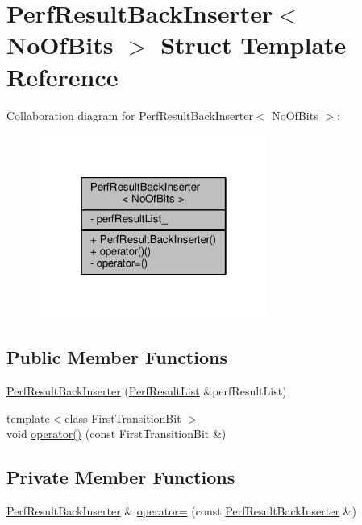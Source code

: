 \hypertarget{struct_perf_result_back_inserter}{}\section{Perf\+Result\+Back\+Inserter$<$ No\+Of\+Bits $>$ Struct Template Reference}
\label{struct_perf_result_back_inserter}


Collaboration diagram for Perf\+Result\+Back\+Inserter$<$ No\+Of\+Bits $>$\+:
\nopagebreak
\begin{figure}[H]
\begin{center}
\leavevmode
\includegraphics[width=214pt]{struct_perf_result_back_inserter__coll__graph}
\end{center}
\end{figure}
\subsection*{Public Member Functions}
\begin{DoxyCompactItemize}
\item 
\mbox{\hyperlink{struct_perf_result_back_inserter_a1b52c688257516683577fd1b6edec0f1}{Perf\+Result\+Back\+Inserter}} (\mbox{\hyperlink{_performance_8cpp_a6182ff5fcd4814adbff677bd44fd6ae4}{Perf\+Result\+List}} \&perf\+Result\+List)
\item 
{\footnotesize template$<$class First\+Transition\+Bit $>$ }\\void \mbox{\hyperlink{struct_perf_result_back_inserter_a14981b64815b35c77f99c7db5ac4db15}{operator()}} (const First\+Transition\+Bit \&)
\end{DoxyCompactItemize}
\subsection*{Private Member Functions}
\begin{DoxyCompactItemize}
\item 
\mbox{\hyperlink{struct_perf_result_back_inserter}{Perf\+Result\+Back\+Inserter}} \& \mbox{\hyperlink{struct_perf_result_back_inserter_aea34517edb94602fc11dc52b7c78163a}{operator=}} (const \mbox{\hyperlink{struct_perf_result_back_inserter}{Perf\+Result\+Back\+Inserter}} \&)
\end{DoxyCompactItemize}
